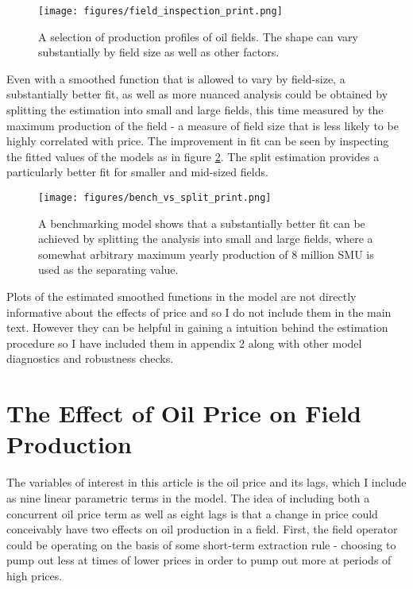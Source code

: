 \documentclass[12pt]{article}
\begin{document}
\begin{figure}
	\texttt{[image: figures/field\_inspection\_print.png]}
	\caption{A selection of production profiles of oil fields.  The shape can vary substantially by field size as well as other factors.}
	\label{field_inspection}
\end{figure}

Even with a smoothed function that is allowed to vary by field-size, a substantially better fit, as well as more nuanced analysis could be obtained by splitting the estimation into small and large fields, this time measured by the maximum production of the field - a measure of field size that is less likely to be highly correlated with price.  The improvement in fit can be seen by inspecting the fitted values of the models as in figure \ref{bench_vs_split}. The split estimation provides a particularly better fit for smaller and mid-sized fields.

\begin{figure}
	\texttt{[image: figures/bench\_vs\_split\_print.png]}
	\caption{A benchmarking model shows that a substantially better fit can be achieved by splitting the analysis into small and large fields, where a somewhat arbitrary maximum yearly production of 8 million SMU is used as the separating value.}
	\label{bench_vs_split}
\end{figure}

Plots of the estimated smoothed functions in the model are not directly informative about the effects of price and so I do not include them in the main text.  However they can be helpful in gaining a intuition behind the estimation procedure so I have included them in appendix 2 along with other model diagnostics and robustness checks.  

\section{The Effect of Oil Price on Field Production}

The variables of interest in this article is the oil price and its lags, which I include as nine linear parametric terms in the model.  The idea of including both a concurrent oil price term as well as eight lags is that a change in price could conceivably have two effects on oil production in a field.  First, the field operator could be operating on the basis of some short-term extraction rule - choosing to pump out less at times of lower prices in order to pump out more at periods of high prices.  
\end{document}
